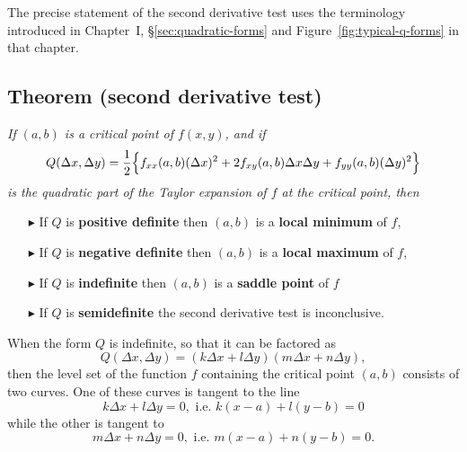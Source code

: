The precise statement of the second derivative test uses the
terminology introduced in Chapter~I, \S\ref{sec:quadratic-forms} and Figure~\ref{fig:typical-q-forms} in that chapter.

\subsection*{Theorem (second derivative test)}\itshape  
If $(a, b)$ is a critical point of $f(x, y)$, and if 
\[
Q(\Delta x, \Delta y) = 
  \frac{1}{2}\Bigl\{
  f_{xx}(a, b)(\Delta x)^2 + 2f_{xy}(a,b)\Delta x \Delta y +
  f_{yy}(a,b)(\Delta y)^2
  \Bigr\}
\]
is the quadratic part of the Taylor expansion of $f$ at the critical
point, then 
\begin{itemize}
\item[$\blacktriangleright$] If $Q$ is \textbf{positive definite} then
  $(a,b)$ is a \textbf{local minimum} of $f$,
\item[$\blacktriangleright$] If $Q$ is \textbf{negative definite} then
  $(a,b)$ is a \textbf{local maximum} of $f$,
\item[$\blacktriangleright$] If $Q$ is \textbf{indefinite} then $(a,
  b)$ is a \textbf{saddle point} of $f$
\item[$\blacktriangleright$] If $Q$ is \textbf{semidefinite} the second
  derivative test is inconclusive.
\end{itemize}
\upshape
When the form $Q$ is indefinite, so that it can be factored as
\[
Q(\Delta x, \Delta y) = (k\Delta x + l\Delta y)(m\Delta x+n\Delta y),
\]
then the level set of the function $f$ containing the critical point
$(a, b)$ consists of two curves. One of these curves is tangent to the
line
\[
k\Delta x+l\Delta y = 0, \text{ i.e. } k(x-a) + l(y-b) = 0
\]
while the other is tangent to
\[
m\Delta x+n\Delta y = 0, \text{ i.e. } m(x-a) + n(y-b) = 0.
\]

